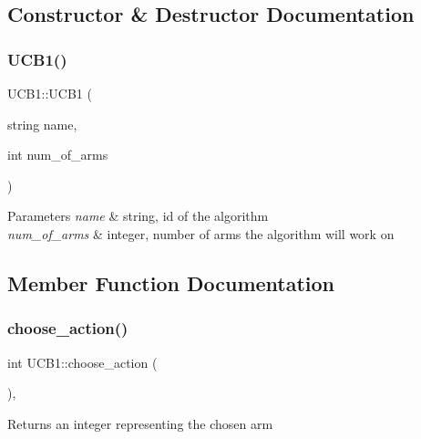 \subsection{Constructor \& Destructor Documentation}
\mbox{\label{class_u_c_b1_a063ccddba0179d29086913d9c61c330b}} 
\subsubsection{\texorpdfstring{U\+C\+B1()}{UCB1()}}
{\footnotesize\ttfamily U\+C\+B1\+::\+U\+C\+B1 (\begin{DoxyParamCaption}\item[{string}]{name,  }\item[{int}]{num\+\_\+of\+\_\+arms }\end{DoxyParamCaption})}


\begin{DoxyParams}{Parameters}
{\em name} & string, id of the algorithm \\
\hline
{\em num\+\_\+of\+\_\+arms} & integer, number of arms the algorithm will work on \\
\hline
\end{DoxyParams}


\subsection{Member Function Documentation}
\mbox{\label{class_u_c_b1_ac71b279c529fdcca156e984550ad3ed3}} 
\subsubsection{\texorpdfstring{choose\+\_\+action()}{choose\_action()}}
{\footnotesize\ttfamily int U\+C\+B1\+::choose\+\_\+action (\begin{DoxyParamCaption}{ }\end{DoxyParamCaption})\hspace{0.3cm}{\ttfamily [override]}, {\ttfamily [virtual]}}

\begin{DoxyReturn}{Returns}
an integer representing the chosen arm 
\end{DoxyReturn}


